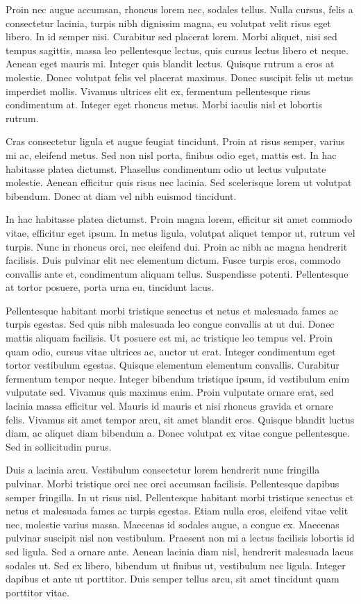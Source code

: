 Proin nec augue accumsan, rhoncus lorem nec, sodales tellus. Nulla cursus, felis a consectetur lacinia, turpis nibh dignissim magna, eu volutpat velit risus eget libero. In id semper nisi. Curabitur sed placerat lorem. Morbi aliquet, nisi sed tempus sagittis, massa leo pellentesque lectus, quis cursus lectus libero et neque. Aenean eget mauris mi. Integer quis blandit lectus. Quisque rutrum a eros at molestie. Donec volutpat felis vel placerat maximus. Donec suscipit felis ut metus imperdiet mollis. Vivamus ultrices elit ex, fermentum pellentesque risus condimentum at. Integer eget rhoncus metus. Morbi iaculis nisl et lobortis rutrum.

Cras consectetur ligula et augue feugiat tincidunt. Proin at risus semper, varius mi ac, eleifend metus. Sed non nisl porta, finibus odio eget, mattis est. In hac habitasse platea dictumst. Phasellus condimentum odio ut lectus vulputate molestie. Aenean efficitur quis risus nec lacinia. Sed scelerisque lorem ut volutpat bibendum. Donec at diam vel nibh euismod tincidunt.

In hac habitasse platea dictumst. Proin magna lorem, efficitur sit amet commodo vitae, efficitur eget ipsum. In metus ligula, volutpat aliquet tempor ut, rutrum vel turpis. Nunc in rhoncus orci, nec eleifend dui. Proin ac nibh ac magna hendrerit facilisis. Duis pulvinar elit nec elementum dictum. Fusce turpis eros, commodo convallis ante et, condimentum aliquam tellus. Suspendisse potenti. Pellentesque at tortor posuere, porta urna eu, tincidunt lacus.

Pellentesque habitant morbi tristique senectus et netus et malesuada fames ac turpis egestas. Sed quis nibh malesuada leo congue convallis at ut dui. Donec mattis aliquam facilisis. Ut posuere est mi, ac tristique leo tempus vel. Proin quam odio, cursus vitae ultrices ac, auctor ut erat. Integer condimentum eget tortor vestibulum egestas. Quisque elementum elementum convallis. Curabitur fermentum tempor neque. Integer bibendum tristique ipsum, id vestibulum enim vulputate sed. Vivamus quis maximus enim. Proin vulputate ornare erat, sed lacinia massa efficitur vel. Mauris id mauris et nisi rhoncus gravida et ornare felis. Vivamus sit amet tempor arcu, sit amet blandit eros. Quisque blandit luctus diam, ac aliquet diam bibendum a. Donec volutpat ex vitae congue pellentesque. Sed in sollicitudin purus.

Duis a lacinia arcu. Vestibulum consectetur lorem hendrerit nunc fringilla pulvinar. Morbi tristique orci nec orci accumsan facilisis. Pellentesque dapibus semper fringilla. In ut risus nisl. Pellentesque habitant morbi tristique senectus et netus et malesuada fames ac turpis egestas. Etiam nulla eros, eleifend vitae velit nec, molestie varius massa. Maecenas id sodales augue, a congue ex. Maecenas pulvinar suscipit nisl non vestibulum. Praesent non mi a lectus facilisis lobortis id sed ligula. Sed a ornare ante. Aenean lacinia diam nisl, hendrerit malesuada lacus sodales ut. Sed ex libero, bibendum ut finibus ut, vestibulum nec ligula. Integer dapibus et ante ut porttitor. Duis semper tellus arcu, sit amet tincidunt quam porttitor vitae.

